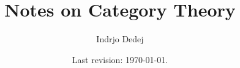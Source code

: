 



\title{Notes on Category Theory}
\author{Indrjo Dedej}
\date{Last revision: \today{}.}



\maketitle

%

\tableofcontents
\restoregeometry



\printbibliography


